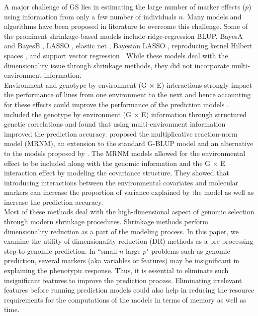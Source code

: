 A major challenge of GS lies in estimating the large number of marker effects ($p$) using information from only a few number of individuals $n$. Many models and algorithms have been proposed in literature to overcome this challenge. Some of the prominent shrinkage-based models include ridge-regression BLUP, BayesA and BayesB \cite{meuwissen_prediction_2001}, LASSO \cite{usai_lasso_2009}, elastic net \cite{zou_regularization_2005}, Bayesian LASSO \cite{de_los_campos_predicting_2009}, reproducing kernel Hilbert spaces \cite{gianola_genomic-assisted_2006, de_los_campos_semi-parametric_2010}, and support vector regression \cite{moser_comparison_2009, long_application_2011}. While these models deal with the dimensionality issue through shrinkage methods, they did not incorporate multi-environment information.\\

Environment and genotype by environment (G $\times$ E) interactions strongly impact the performance of lines from one environment to the next and hence accounting for these effects could improve the performance of the prediction models \cite{roorkiwal_genomic-enabled_2018, jarquin_increasing_2017}.  \cite{burgueno_genomic_2012} included the genotype by environment (G $\times$ E) information through structured genetic correlations and found that using multi-environment information improved the prediction accuracy. \cite{jarquin_reaction_2014} proposed the multiplicative reaction-norm model (MRNM), an extension to the standard G-BLUP model and an alternative to the models proposed by \cite{burgueno_genomic_2012}. The MRNM models allowed for the environmental effect to be included along with the genomic information and the G $\times$ E interaction effect by modeling the covariance structure. They showed that introducing interactions between the environmental covariates and molecular markers can increase the proportion of variance explained by the model as well as increase the prediction accuracy. \\

Most of these methods deal with the high-dimensional aspect of genomic selection through modern shrinkage procedures. Shrinkage methods perform dimensionality reduction as a part of the modeling process. In this paper, we examine the utility of dimensionality reduction (DR) methods as a pre-processing step to genomic prediction. In ``small $n$ large $p$" problems such as genomic prediction, several markers (aka variables or features) may be insignificant in explaining the phenotypic response. Thus, it is essential to eliminate such insignificant features to improve the prediction process. Eliminating irrelevant features before running prediction models could also help in reducing the resource requirements for the computations of the models in terms of memory as well as time. \\

